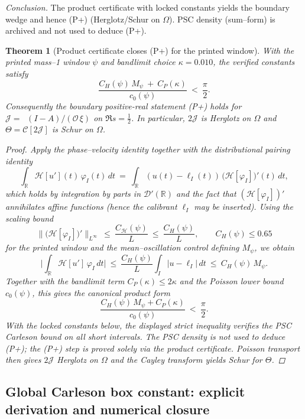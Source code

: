 \documentclass[11pt]{article}
\newtheorem{theorem}{Theorem}
\theoremstyle{definition}
\theoremstyle{remark}
\newcommand{\R}{\mathbb{R}}
\DeclareMathOperator{\dettwo}{det_2}
\begin{document}
\medskip
\noindent\emph{Conclusion.}
The product certificate with locked constants yields the boundary wedge and hence \textup{(P+)} (Herglotz/Schur on $\Omega$). PSC density (sum--form) is archived and not used to deduce (P+).
\begin{theorem}[Product certificate closes (P+) for the printed window]\label{thm:certificate-inpaper}
With the printed mass--1 window $\psi$ and bandlimit choice $\kappa=0.010$, the verified constants satisfy
\[
  \frac{C_H(\psi)\,M_\psi\ +\ C_P(\kappa)}{\,c_0(\psi)\,}\ <\ \frac{\pi}{2}.
\]
Consequently the boundary positive-real statement \emph{(P+)} holds for $\mathcal J=\dettwo(I-A)/(\mathcal O\,\xi)$ on $\Re s=\tfrac12$. In particular, $2\mathcal J$ is Herglotz on $\Omega$ and $\Theta=\mathcal C[2\mathcal J]$ is Schur on $\Omega$.
\begin{proof}
Apply the phase--velocity identity together with the distributional pairing identity
\[
  \int_\R \mathcal H[u'](t)\,\varphi_I(t)\,dt\ =\ \int_\R (u(t)-\ell_I(t))\,\big(\mathcal H[\varphi_I]\big)'(t)\,dt,
\]
which holds by integration by parts in $\mathcal D'(\R)$ and the fact that $(\mathcal H[\varphi_I])'$ annihilates affine functions (hence the calibrant $\ell_I$ may be inserted). Using the scaling bound
\[
  \big\|\big(\mathcal H[\varphi_I]\big)'\big\|_{L^\infty}\ \le\ \frac{C_{\mathcal H}(\psi)}{L}\ \le\ \frac{C_H(\psi)}{L},\qquad C_H(\psi)\le 0.65
\]
for the printed window and the mean--oscillation control defining $M_\psi$, we obtain
\[
  \Big|\int_\R \mathcal H[u']\,\varphi_I\,dt\Big|\ \le\ \frac{C_H(\psi)}{L}\int_I |u-\ell_I|\,dt\ \le\ C_H(\psi)\,M_\psi.
\]
Together with the bandlimit term $C_P(\kappa)\le 2\kappa$ and the Poisson lower bound $c_0(\psi)$, this gives the canonical product form
\[
  \frac{C_H(\psi)\,M_\psi + C_P(\kappa)}{c_0(\psi)}\ <\ \frac{\pi}{2}.
\]
With the locked constants below, the displayed strict inequality verifies the PSC Carleson bound on all short intervals. The PSC density is not used to deduce (P+); the (P+) step is proved solely via the product certificate. Poisson transport then gives $2\mathcal J$ Herglotz on $\Omega$ and the Cayley transform yields Schur for $\Theta$.
\end{proof}
\end{theorem}

\subsection*{Global Carleson box constant: explicit derivation and numerical closure}
\end{document}
